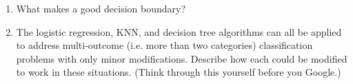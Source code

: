 \begin{enumerate}
\begin{center}
\end{center}
\item What makes a good decision boundary?
\item The logistic regression, KNN, and decision tree algorithms can all be applied to address multi-outcome (i.e. more than two categories) classification problems with only minor modifications. Describe how each could be modified to work in these situations. (Think through this yourself before you Google.)
\end{enumerate}



